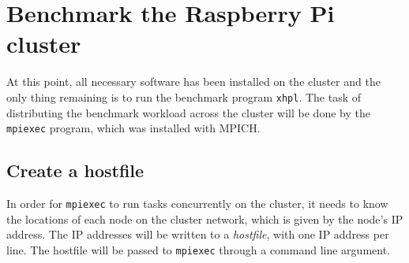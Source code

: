 \documentclass{article}
\begin{document}
\section{Benchmark the Raspberry Pi cluster}

At this point, all necessary software has been installed on the cluster and the only thing remaining is to run the benchmark program \texttt{xhpl}. The task of distributing the benchmark workload across the cluster will be done by the \texttt{mpiexec} program, which was installed with MPICH.

\subsection{Create a hostfile}

In order for \texttt{mpiexec} to run tasks concurrently on the cluster, it needs to know the locations of each node on the cluster network, which is given by the node's IP address. The IP addresses will be written to a \emph{hostfile}, with one IP address per line. The hostfile will be passed to \texttt{mpiexec} through a command line argument. 
\end{document}
